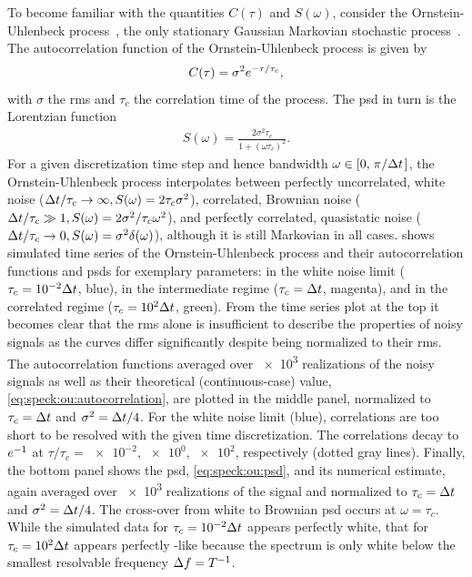 To become familiar with the quantities $C(\tau)$ and $S(\omega)$, consider the Ornstein\hyp{}Uhlenbeck process~\cite{Uhlenbeck1930}, the only stationary Gaussian Markovian stochastic process~\cite{VanKampen1976}.
The autocorrelation function of the Ornstein-Uhlenbeck process is given by
\begin{align}\label{eq:speck:ou:autocorrelation}
    C(\tau) = \sigma^2e^{-\tau/\tau_c},
\end{align}
with $\sigma$ the \gls{rms} and $\tau_c$ the correlation time of the process.
The \gls{psd} in turn is the Lorentzian function
\begin{align}\label{eq:speck:ou:psd}
    S(\omega) = \frac{2\sigma^2\tau_c}{1 + (\omega\tau_c)^2}.
\end{align}
For a given discretization time step \dt and hence bandwidth $\omega\in [0, \flatfrac{\pi}{\dt}]$, the Ornstein-Uhlenbeck process interpolates between perfectly uncorrelated, white noise ($\Delta t/\tau_c\to\infty, S(\omega) = 2\tau_c\sigma^2$), correlated, Brownian noise ($\Delta t/\tau_c\gg 1, S(\omega) = 2\sigma^2/\tau_c\omega^2$), and perfectly correlated, quasistatic noise ($\Delta t/\tau_c\to 0, S(\omega) = \sigma^2\delta(\omega)$), although it is still Markovian in all cases.
 shows simulated time series of the Ornstein-Uhlenbeck process and their autocorrelation functions and \glspl{psd} for exemplary parameters: in the white noise limit ($\tau_c = \num{e-2}\Delta t$, blue), in the intermediate regime ($\tau_c = \Delta t$, magenta), and in the correlated regime ($\tau_c = \num{e+2}\Delta t$, green).
From the time series plot at the top it becomes clear that the \gls{rms} alone is insufficient to describe the properties of noisy signals as the curves differ significantly despite being normalized to their \gls{rms}.
The autocorrelation functions averaged over \num{e3} realizations of the noisy signals as well as their theoretical (continuous-case) value, \cref{eq:speck:ou:autocorrelation}, are plotted in the middle panel, normalized to $\tau_c=\Delta t$ and $\sigma^2=\Delta t/4$.
For the white noise limit (blue), correlations are too short to be resolved with the given time discretization.
The correlations decay to $e^{-1}$ at $\tau/\tau_c=\num{e-2},\num{e0},\num{e+2}$, respectively (dotted gray lines).
Finally, the bottom panel shows the \gls{psd}, \cref{eq:speck:ou:psd}, and its numerical estimate, again averaged over \num{e3} realizations of the signal and normalized to $\tau_c=\Delta t$ and $\sigma^2=\Delta t/4$.
The cross-over from white to Brownian \gls{psd} occurs at $\omega = \tau_c$.
While the simulated data for $\tau_c = \num{e-2}\Delta t$ appears perfectly white, that for $\tau_c = \num{e2}\Delta t$ appears perfectly \oneoverf-like because the spectrum is only white below the smallest resolvable frequency $\Delta f = T^{-1}$.

